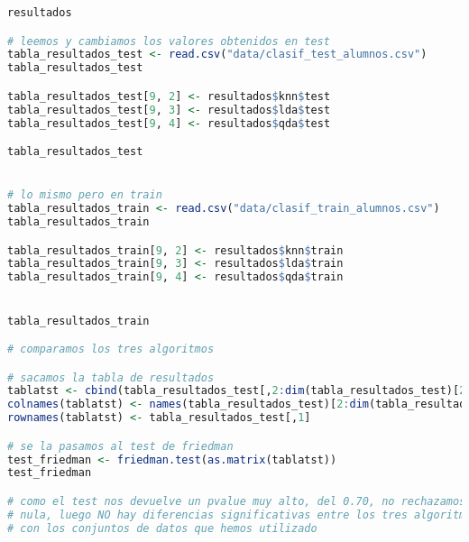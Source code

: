 \begin{lstlisting}[language=R]
resultados

# leemos y cambiamos los valores obtenidos en test
tabla_resultados_test <- read.csv("data/clasif_test_alumnos.csv")
tabla_resultados_test

tabla_resultados_test[9, 2] <- resultados$knn$test
tabla_resultados_test[9, 3] <- resultados$lda$test
tabla_resultados_test[9, 4] <- resultados$qda$test

tabla_resultados_test


# lo mismo pero en train
tabla_resultados_train <- read.csv("data/clasif_train_alumnos.csv")
tabla_resultados_train

tabla_resultados_train[9, 2] <- resultados$knn$train
tabla_resultados_train[9, 3] <- resultados$lda$train
tabla_resultados_train[9, 4] <- resultados$qda$train


tabla_resultados_train

# comparamos los tres algoritmos

# sacamos la tabla de resultados
tablatst <- cbind(tabla_resultados_test[,2:dim(tabla_resultados_test)[2]])
colnames(tablatst) <- names(tabla_resultados_test)[2:dim(tabla_resultados_test)[2]]
rownames(tablatst) <- tabla_resultados_test[,1]

# se la pasamos al test de friedman
test_friedman <- friedman.test(as.matrix(tablatst))
test_friedman

# como el test nos devuelve un pvalue muy alto, del 0.70, no rechazamos la hipotesis
# nula, luego NO hay diferencias significativas entre los tres algoritmos
# con los conjuntos de datos que hemos utilizado
\end{lstlisting}
